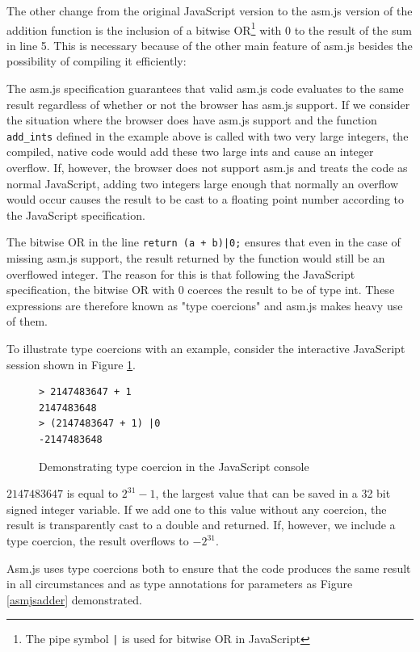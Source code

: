\documentclass[11pt]{report}
\begin{document}
The other change from the original JavaScript version to the asm.js version of the addition function is the inclusion of a bitwise OR\footnote{The pipe symbol \texttt{|} is used for bitwise OR in JavaScript} with 0 to the result of the sum in line 5. This is necessary because of the other main feature of asm.js besides the possibility of compiling it efficiently:

The asm.js specification \cite{asmjsspec} guarantees that valid asm.js code evaluates to the same result regardless of whether or not the browser has asm.js support. If we consider the situation where the browser does have asm.js support and the function \texttt{add_ints} defined in the example above is called with two very large integers, the compiled, native code would add these two large ints and cause an integer overflow. If, however, the browser does not support asm.js and treats the code as normal JavaScript, adding two integers large enough that normally an overflow would occur causes the result to be cast to a floating point number according to the JavaScript specification.

The bitwise OR in the line \texttt{return (a + b)|0;} ensures that even in the case of missing asm.js support, the result returned by the function would still be an overflowed integer. The reason for this is that following the JavaScript specification, the bitwise OR with 0 coerces the result to be of type int. These expressions are therefore known as "type coercions" and asm.js makes heavy use of them.

To illustrate type coercions with an example, consider the interactive JavaScript session shown in Figure \ref{jstypecoercion}.

\begin{figure}[ht]
\begin{lstlisting}
> 2147483647 + 1
2147483648
> (2147483647 + 1) |0
-2147483648
\end{lstlisting}
\caption{Demonstrating type coercion in the JavaScript console}
\label{jstypecoercion}
\end{figure}

$2147483647$ is equal to $2^{31}-1$, the largest value that can be saved in a 32 bit signed integer variable. If we add one to this value without any coercion, the result is transparently cast to a double and returned. If, however, we include a type coercion, the result overflows to $-2^{31}$.

Asm.js uses type coercions both to ensure that the code produces the same result in all circumstances and as type annotations for parameters as Figure \ref{asmjsadder} demonstrated.
\end{document}
